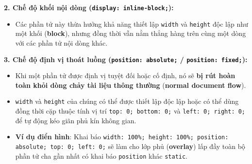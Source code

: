 \documentclass[11pt,oneside]{book}
\newcommand{\codeinline}[1]{\textcolor{accentOrange}{\texttt{#1}}}
\newcommand{\term}[1]{\textbf{\textcolor{primaryBlue}{#1}}}
\begin{document}
\begin{tcolorbox}[
    enhanced,
    colback=white,
    colframe=successGreen!75!black,
    arc=4pt,
    boxrule=0.8pt,
    leftrule=3.5pt,
    top=4pt, bottom=4pt, left=8pt, right=8pt,
    before=\par\vspace{3pt}\noindent,
    after=\par\vspace{3pt}
]
{\bfseries\color{successGreen!85!black}\normalsize 2. Chế độ khối nội dòng (\codeinline{display: inline-block;}):}
\begin{itemize}[leftmargin=1.2em, itemsep=2pt, parsep=0pt, topsep=2pt]
    \item Các phần tử này thừa hưởng khả năng thiết lập \codeinline{width} và \codeinline{height} độc lập như một khối (\term{block}), nhưng đồng thời vẫn nằm thẳng hàng trên cùng một dòng với các phần tử nội dòng khác.
\end{itemize}
\end{tcolorbox}

\begin{tcolorbox}[
    enhanced,
    colback=white,
    colframe=primaryBlue,
    arc=4pt,
    boxrule=0.8pt,
    leftrule=3.5pt,
    top=4pt, bottom=4pt, left=8pt, right=8pt,
    before=\par\vspace{3pt}\noindent,
    after=\par\vspace{3pt}
]
{\bfseries\color{primaryBlue}\normalsize 3. Chế độ định vị thoát luồng (\codeinline{position: absolute;} / \codeinline{position: fixed;}):}
\begin{itemize}[leftmargin=1.2em, itemsep=2pt, parsep=0pt, topsep=2pt]
    \item Khi một phần tử được định vị tuyệt đối hoặc cố định, nó sẽ \textbf{bị rút hoàn toàn khỏi dòng chảy tài liệu thông thường} (\term{normal document flow}).
    \item \codeinline{width} và \codeinline{height} của chúng có thể được thiết lập độc lập hoặc có thể dùng đồng thời cặp thuộc tính vị trí \codeinline{top: 0; bottom: 0;} và \codeinline{left: 0; right: 0;} để tự động kéo giãn phủ kín không gian.
    \item \textbf{Ví dụ điển hình}: Khai báo \codeinline{width: 100\%; height: 100\%; position: absolute; top: 0; left: 0;} sẽ làm cho lớp phủ (\term{overlay}) lấp đầy toàn bộ phần tử cha gần nhất có khai báo \codeinline{position} khác \codeinline{static}.
\end{itemize}
\end{tcolorbox}
\end{document}
